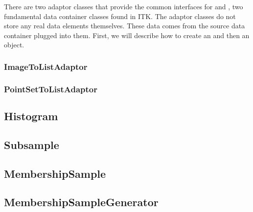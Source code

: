 There are two adaptor classes that provide the common
 interfaces for  and
, two fundamental data container classes found in ITK. The
adaptor classes do not store any real data elements themselves. These data
comes from the source data container plugged into them. First, we will
describe how to create an
 and then an
 object.

\subsubsection{ImageToListAdaptor}
\label{sec:ImageToListAdaptor}

\ifitkFullVersion 

\fi

\subsubsection{PointSetToListAdaptor}
\label{sec:PointSetToListAdaptor}

\ifitkFullVersion 

\fi

\ifitkFullVersion 

\fi


\subsection{Histogram}
\label{sec:Histogram}

\ifitkFullVersion 

\fi

\subsection{Subsample}
\label{sec:Subsample}

\ifitkFullVersion 

\fi

\subsection{MembershipSample}
\label{sec:MembershipSample}

\ifitkFullVersion 

\fi

\subsection{MembershipSampleGenerator}
\label{sec:MembershipSampleGenerator}

